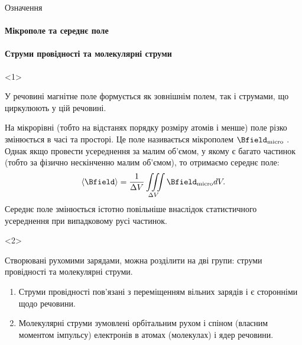 \documentclass{beamer}
\begin{document}
\begin{frame}{Означення}{}
	\framesubtitle<1>{Мікрополе та середнє поле}
	\framesubtitle<2>{Струми провідності та молекулярні струми}
	\begin{onlyenv}
		\begin{block}{}\justifying
			У речовині магнітне поле формується як зовнішнім полем, так і струмами, що циркулюють у цій речовині.

			\bigskip

			На мікрорівні (тобто на відстанях
			порядку розміру атомів і менше) поле різко змінюється в часі та просторі. Це поле називається \alert{мікрополем} $\Bfield_\text{micro}$ .
			Однак якщо провести усереднення за малим об'ємом, у якому є багато частинок (тобто за фізично нескінченно малим об'ємом), то отримаємо
			середнє поле:
			\begin{equation*}
				\left\langle \Bfield\right\rangle = \frac1{\Delta V} \iiint\limits_{\Delta V}
				\Bfield_\text{micro} dV.
			\end{equation*}
			\alert{Середнє поле} змінюється істотно повільніше внаслідок статистичного усереднення при випадковому русі частинок.
		\end{block}
	\end{onlyenv}
	\begin{onlyenv}
		\begin{block}{}\justifying
			Створювані рухомими зарядами, можна розділити на дві групи: \alert{струми провідності} та \alert{молекулярні струми}.
			\begin{enumerate}
				\item \alert{Струми провідності} пов'язані з переміщенням вільних зарядів і є сторонніми щодо речовини.
				\item \alert{Молекулярні струми} зумовлені орбітальним рухом і спіном (власним моментом імпульсу) електронів в атомах (молекулах) і ядер речовини.
			\end{enumerate}
		\end{block}
	\end{onlyenv}
\end{frame}
\end{document}
